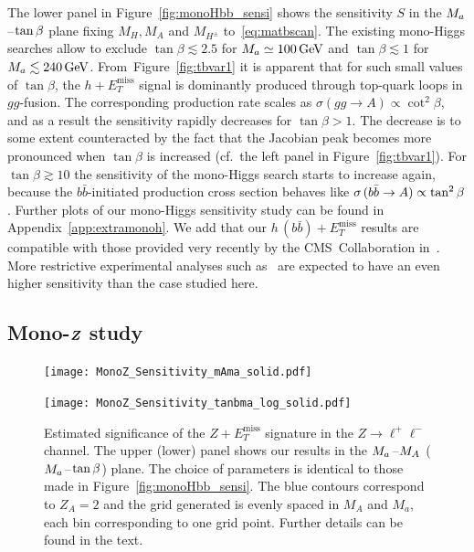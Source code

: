 \documentclass[a4paper, 11pt,notoc]{article}
\newcommand{\MET}{\ensuremath{E_T^\mathrm{miss}}\xspace}
\newcommand{\mA}{\ensuremath{M_{A}}\xspace}
\newcommand{\ma}{\ensuremath{M_{a}}\xspace}
\newcommand{\mH}{\ensuremath{M_{H}}\xspace}
\newcommand{\mHc}{\ensuremath{M_{H^{\pm}}}\xspace}
\def\bm#1{\mbox{\boldmath$#1$\unboldmath}}
\begin{document}
The lower panel in Figure~\ref{fig:monoHbb_sensi} shows the sensitivity $S$ in the $\ma\hspace{0.25mm}$--$\hspace{0.25mm}\tan \beta$ plane fixing  $\mH, \mA$ and  $\mHc$ to~\eqref{eq:matbscan}. The existing mono-Higgs searches allow to exclude $\tan \beta \lesssim 2.5$ for $M_a \simeq 100 \, {\rm GeV}$ and $\tan \beta \lesssim 1$ for $M_a \lesssim 240 \, {\rm GeV}$. From~Figure~\ref{fig:tbvar1} it is apparent that for such small values of $\tan \beta$, the $h + \MET$ signal is dominantly produced through top-quark loops in $gg$-fusion. The corresponding production rate scales as $\sigma \left ( gg \to A \right ) \propto \cot^2 \beta$, and as a result the sensitivity rapidly decreases for $\tan \beta > 1$. The decrease is to some extent counteracted by the fact that the Jacobian peak becomes more pronounced when  $\tan \beta$ is increased (cf.~the left panel in Figure~\ref{fig:tbvar1}). For $\tan \beta \gtrsim 10$ the sensitivity of the mono-Higgs search  starts to increase again, because the $b \bar b$-initiated production cross section behaves like $\sigma \hspace{0.5mm} ( b \bar b \to A  ) \propto \tan^2 \beta$. Further plots of our mono-Higgs sensitivity study can be found in Appendix~\ref{app:extramonoh}.  We add that our $h \, (b \bar b) + \MET$ results are compatible with those provided very recently by the CMS~Collaboration in~\cite{CMS-PAS-EXO-16-050}. More restrictive experimental analyses such as~\cite{Sirunyan:2018qob} are expected to have an even higher sensitivity than the case  studied here. 

\subsection[Mono-$Z$ study]{Mono-$\bm{Z}$ study}
\label{sec:sensi_monozll}

\begin{figure}[t!]
\centering
\texttt{[image: MonoZ\_Sensitivity\_mAma\_solid.pdf]} 

\vspace{2mm}

\texttt{[image: MonoZ\_Sensitivity\_tanbma\_log\_solid.pdf]} 
\vspace{2mm}
\caption{Estimated significance of the $Z+\MET$ signature in the $Z \to \ell^+ \ell^-$ channel. The upper (lower) panel shows our results in the $\ma\hspace{0.25mm}$--$\hspace{0.25mm}\mA$ ($\ma\hspace{0.25mm}$--$\hspace{0.25mm}\tan \beta$) plane. The choice of parameters is identical to those made in Figure~\ref{fig:monoHbb_sensi}. The blue contours correspond to $Z_A = 2$ and the grid generated is evenly spaced in \mA and \ma, each bin corresponding to one grid point. Further details can be found in the text. }
\label{fig:monoZll_sensi}
\end{figure}
\end{document}
